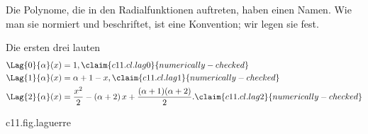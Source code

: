 \begin{vertiefung}[id=c11.v2,
    titel={Die allgemeine Radialfunktion},
    wozu={Der Kern prüft die Lösungen für $\nqn \leq 2$ durch Einsetzen. Hier steht die
      Formel für alle $\nqn$ und $\lqn$, der Beweis von Theorem~\ref{c11.thm.spektrum}
      und der Beweis, dass der Vorfaktor die Radialfunktionen normiert.},
    voraussetzung={Kern~\ref{c11.s4}. Nicht nötig für die Abschnitte~\ref{c11.s5} bis
      \ref{c11.s7}, die mit den ausgeschriebenen Funktionen für $\nqn \leq 2$ arbeiten.},
    zurueck={Zu jedem $\nqn$ und jedem $\lqn < \nqn$ gibt es eine normierte Radialfunktion
      zur Energie $\En{\nqn}$: ein Polynom vom Grad $\nqn - \lqn - 1$ mal
      $\rad^{\lqn}$ mal einer abfallenden Exponentialfunktion.}]
  Die Polynome, die in den Radialfunktionen auftreten, haben einen Namen. Wie man sie
  normiert und beschriftet, ist eine Konvention; wir legen sie fest.


  Die ersten drei lauten
  \begin{align}
    \Lag{0}{\alpha}(x) &= 1,
      \label{c11.eq.lag0}\claim{c11.cl.lag0}{numerically-checked} \\
    \Lag{1}{\alpha}(x) &= \alpha + 1 - x,
      \label{c11.eq.lag1}\claim{c11.cl.lag1}{numerically-checked} \\
    \Lag{2}{\alpha}(x) &= \frac{x^2}{2} - (\alpha + 2)\,x + \frac{(\alpha + 1)(\alpha + 2)}{2}.
      \label{c11.eq.lag2}\claim{c11.cl.lag2}{numerically-checked}
  \end{align}

  \begin{tpcfigure}{c11.fig.laguerre}
    \caption{Die Polynome $\Lag{k}{1}$ für $k = 0, 1, 2, 3$ nach . Das Polynom zum Index $k$ hat den Grad $k$ und bei $x = 0$ den Wert $k + 1$. Mit $\alpha = 1$ sind das die Polynome, die in den Radialfunktionen der s-Zustände stehen.}
  \end{tpcfigure}



\end{vertiefung}
